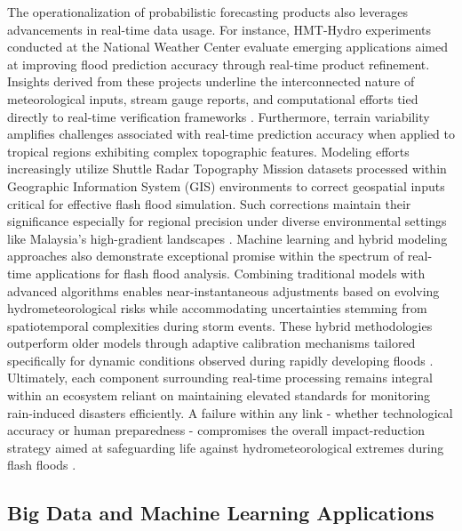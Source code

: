 The operationalization of probabilistic forecasting products also leverages advancements in real-time data usage. For instance, HMT-Hydro experiments conducted at the National Weather Center evaluate emerging applications aimed at improving flood prediction accuracy through real-time product refinement. Insights derived from these projects underline the interconnected nature of meteorological inputs, stream gauge reports, and computational efforts tied directly to real-time verification frameworks \citep{Martinaitis2023}.
Furthermore, terrain variability amplifies challenges associated with real-time prediction accuracy when applied to tropical regions exhibiting complex topographic features. Modeling efforts increasingly utilize Shuttle Radar Topography Mission datasets processed within Geographic Information System (GIS) environments to correct geospatial inputs critical for effective flash flood simulation. Such corrections maintain their significance especially for regional precision under diverse environmental settings like Malaysia's high-gradient landscapes \citep{Maqtan2022a}\citep{Maqtan2022b}.
Machine learning and hybrid modeling approaches also demonstrate exceptional promise within the spectrum of real-time applications for flash flood analysis. Combining traditional models with advanced algorithms enables near-instantaneous adjustments based on evolving hydrometeorological risks while accommodating uncertainties stemming from spatiotemporal complexities during storm events. These hybrid methodologies outperform older models through adaptive calibration mechanisms tailored specifically for dynamic conditions observed during rapidly developing floods \citep{Hinge2024}.
Ultimately, each component surrounding real-time processing remains integral within an ecosystem reliant on maintaining elevated standards for monitoring rain-induced disasters efficiently. A failure within any link - whether technological accuracy or human preparedness - compromises the overall impact-reduction strategy aimed at safeguarding life against hydrometeorological extremes during flash floods \citep{Jubach2016}.

\subsection{Big Data and Machine Learning Applications}

